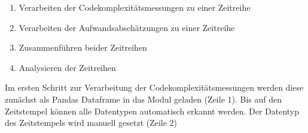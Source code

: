 \begin{enumerate}
\def\labelenumi{\arabic{enumi}.}
\item
    Verarbeiten der Codekomplexitätsmessungen zu einer Zeitreihe
\item
    Verarbeiten der Aufwandsabschätzungen zu einer Zeitreihe
\item
    Zusammenführen beider Zeitreihen
\item
    Analysieren der Zeitreihen
\end{enumerate}

Im ersten Schritt zur Verarbeitung der Codekomplexitätsmessungen werden
diese zunächst als Pandas Dataframe in das Modul geladen (Zeile 1). Bis
auf den Zeitstempel können alle Datentypen automatisch erkannt werden.
Der Datentyp des Zeitstempels wird manuell gesetzt (Zeile 2)